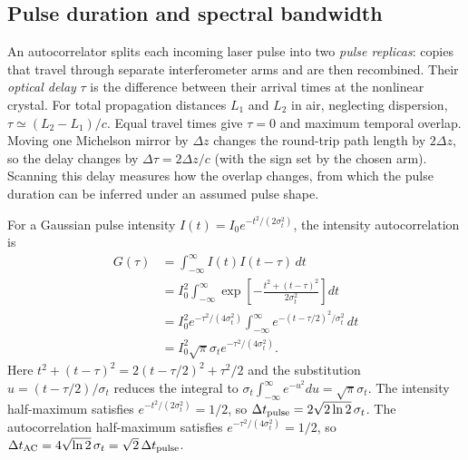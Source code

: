 \documentclass[11pt,a4paper]{article}
\begin{document}
\subsection{Pulse duration and spectral bandwidth}
An autocorrelator splits each incoming laser pulse into two \emph{pulse replicas}: copies that travel through separate interferometer arms and are then recombined. Their \emph{optical delay} $\tau$ is the difference between their arrival times at the nonlinear crystal. For total propagation distances $L_1$ and $L_2$ in air, neglecting dispersion, $\tau\simeq(L_2-L_1)/c$. Equal travel times give $\tau=0$ and maximum temporal overlap. Moving one Michelson mirror by $\Delta z$ changes the round-trip path length by $2\Delta z$, so the delay changes by $\Delta\tau=2\Delta z/c$ (with the sign set by the chosen arm). Scanning this delay measures how the overlap changes, from which the pulse duration can be inferred under an assumed pulse shape.

For a Gaussian pulse intensity $I(t)=I_0e^{-t^2/(2\sigma_t^2)}$, the intensity autocorrelation is
\begin{align}
G(\tau)&=\int_{-\infty}^{\infty}I(t)I(t-\tau)\,dt\\
&=I_0^2\int_{-\infty}^{\infty}\exp\!\left[-\frac{t^2+(t-\tau)^2}{2\sigma_t^2}\right]dt\\
&=I_0^2e^{-\tau^2/(4\sigma_t^2)}\int_{-\infty}^{\infty}e^{-(t-\tau/2)^2/\sigma_t^2}\,dt\\
&=I_0^2\sqrt{\pi}\sigma_t e^{-\tau^2/(4\sigma_t^2)}.
\end{align}
Here $t^2+(t-\tau)^2=2(t-\tau/2)^2+\tau^2/2$ and the substitution $u=(t-\tau/2)/\sigma_t$ reduces the integral to $\sigma_t\int_{-\infty}^{\infty}e^{-u^2}du=\sqrt{\pi}\sigma_t$. The intensity half-maximum satisfies $e^{-t^2/(2\sigma_t^2)}=1/2$, so $\Delta t_{\rm pulse}=2\sqrt{2\ln2}\,\sigma_t$. The autocorrelation half-maximum satisfies $e^{-\tau^2/(4\sigma_t^2)}=1/2$, so $\Delta t_{\rm AC}=4\sqrt{\ln2}\,\sigma_t=\sqrt{2}\,\Delta t_{\rm pulse}$.
\end{document}
